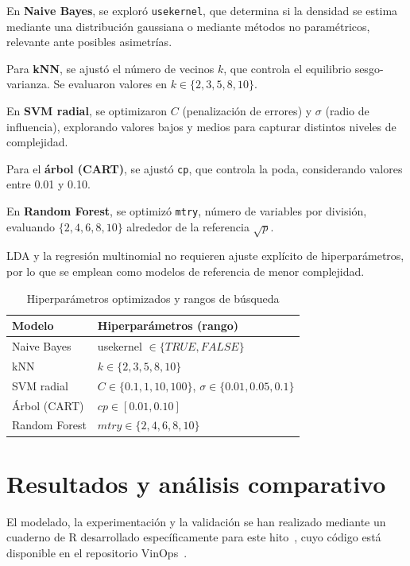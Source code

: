 En \textbf{Naive Bayes}, se exploró \texttt{usekernel}, que determina si la densidad se estima mediante 
una distribución gaussiana o mediante métodos no paramétricos, relevante ante posibles asimetrías.

Para \textbf{kNN}, se ajustó el número de vecinos $k$, que controla el equilibrio sesgo-varianza. Se 
evaluaron valores en $k \in \{2, 3, 5, 8, 10\}$.

En \textbf{SVM radial}, se optimizaron $C$ (penalización de errores) y $\sigma$ (radio de influencia), 
explorando valores bajos y medios para capturar distintos niveles de complejidad.

Para el \textbf{árbol (CART)}, se ajustó \texttt{cp}, que controla la poda, considerando valores entre 
0.01 y 0.10.

En \textbf{Random Forest}, se optimizó \texttt{mtry}, número de variables por división, evaluando 
$\{2, 4, 6, 8, 10\}$ alrededor de la referencia $\sqrt{p}$.

LDA y la regresión multinomial no requieren ajuste explícito de hiperparámetros, por lo que se emplean 
como modelos de referencia de menor complejidad.

\begin{table}[h]
\centering
\caption{Hiperparámetros optimizados y rangos de búsqueda}
\vspace{0.2cm}
\begin{tabular}{l l}
\hline
\textbf{Modelo} & \textbf{Hiperparámetros (rango)} \\
\hline
Naive Bayes & usekernel $\in \{TRUE, FALSE\}$ \\
kNN & $k \in \{2, 3, 5, 8, 10\}$ \\
SVM radial & $C \in \{0.1,1,10,100\}$, $\sigma \in \{0.01,0.05,0.1\}$ \\
Árbol (CART) & $cp \in [0.01, 0.10]$ \\
Random Forest & $mtry \in \{2,4,6,8,10\}$ \\
\hline
\end{tabular}
\label{tab:hiperparametros_resumen}
\end{table}


\section{Resultados y análisis comparativo}

El modelado, la experimentación y la validación se han realizado mediante un cuaderno
de R desarrollado específicamente para este hito~\cite{model_r_script}, cuyo
código está disponible en el repositorio VinOps~\cite{vinops_repo}.

